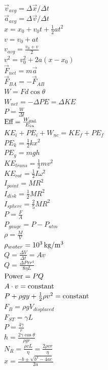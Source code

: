 \documentclass[letterpaper,addpoints,answers]{exam}
\begin{document}
 \fontseries{\seriesdefault}
 \begin{multicols}{2}
 \large
 \noindent
 $\vec{v}_{avg} = \Delta\vec{x} / \Delta t$ \\
 $\vec{a}_{avg} = \Delta\vec{v} / \Delta t$ \\
 $x = x_0 + v_0 t + \frac{1}{2} a t^2$ \\
 $v = v_0 + a t$ \\
 $v_{avg} = \frac{v_0 + v}{2}$ \\
 $v^2 = v_0^2 + 2 a (x - x_0)$ \\
 $\vec{F}_{net} = m \vec{a}$ \\
 $\vec{F}_{BA} = - \vec{F}_{AB}$ \\
 $W = F d \cos\theta$ \\
 $W_{net} = -\Delta PE = \Delta KE$ \\
 $P = \frac{W}{\Delta t}$ \\
 $\hbox{Eff} = \frac{W_{out}}{E_{in}}$ \\
 $KE_i + PE_i + W_{nc} = KE_f + PE_f$ \\
 $PE_k = \frac{1}{2} k x^2$ \\
 $PE_g = m g h$ \\
 $KE_{trans} = \frac{1}{2} m v^2$ \\
 $KE_{rot} = \frac{1}{2} I \omega^2$ \\
 $I_{point} = M R^2$ \\
 $I_{disk} = \frac{1}{2} M R^2$ \\
 $I_{sphere} = \frac{2}{5} M R^2$ \\
 $P = \frac{F}{A}$ \\
 $P_{gauge} = P - P_{atm}$ \\
 $\rho = \frac{M}{V}$ \\
 $\rho_{water} = 10^3\,\hbox{kg}/\hbox{m}^3$ \\
 $Q = \frac{\Delta V}{\Delta t} = A v$ \\
 $Q = \frac{\Delta P \pi r^4}{8 \eta L}$ \\
 $\hbox{Power} = P Q$ \\
 $A \cdot v = \hbox{constant}$ \\
 $P + \rho g y + \frac{1}{2} \rho v^2 = \hbox{constant}$ \\
 $F_B = \rho g V_{displaced}$ \\
 $F_{ST} = \gamma L$ \\
 $P = \frac{4 \gamma}{r}$ \\
 $h = \frac{2 \gamma \cos\theta}{\rho g r}$ \\
 $N_R = \frac{\rho v L}{\eta} = \frac{2 \rho v r}{\eta}$ \\
 $x = \frac{-b \pm \sqrt{b^2 - 4 a c}}{2 a}$ \\


\end{multicols}
\end{document}
